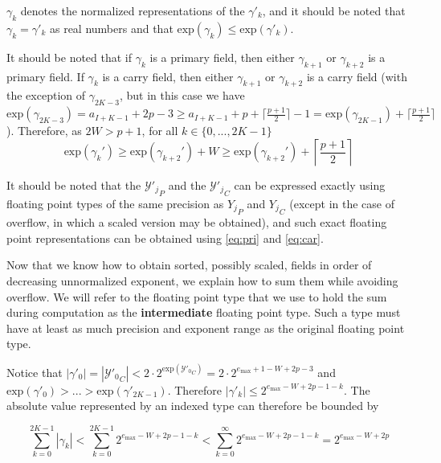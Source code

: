 \documentclass[12pt]{article}
\providecommand{\exp}{\ensuremath{\text{exp}}}
\providecommand{\max}{\ensuremath{\text{max}}}
\theoremstyle{definition}
\numberwithin{equation}{section}
\numberwithin{figure}{section}
\begin{document}
    $\gamma_k$ denotes the normalized representations of the $\gamma'_k$, and it should be noted that $\gamma_k = \gamma'_k$ as real numbers and that $\exp(\gamma_k) \leq \exp(\gamma'_k)$.

    It should be noted that if $\gamma_k$ is a primary field, then either $\gamma_{k + 1}$ or $\gamma_{k + 2}$ is a primary field. If $\gamma_k$ is a carry field, then either $\gamma_{k + 1}$ or $\gamma_{k + 2}$ is a carry field (with the exception of $\gamma_{2  K - 3}$, but in this case we have $\exp(\gamma_{2  K - 3}) = a_{I + K - 1} + 2  p - 3 \geq a_{I + K - 1} + p + \lceil\frac{p + 1}{2}\rceil - 1 = \exp(\gamma_{2  K - 1}) + \lceil\frac{p + 1}{2}\rceil$). Therefore, as $2  W > p + 1$, for all $k \in \{0, ..., 2  K - 1\}$
    \begin{equation}
      \exp(\gamma_k') \geq \exp(\gamma_{k + 2}') + W \geq \exp(\gamma_{k + 2}') + \left\lceil\frac{p + 1}{2}\right\rceil
      \label{eq:gammadecreasesfast}
    \end{equation}

    It should be noted that the ${\mathcal{Y}'_j}_P$ and the ${\mathcal{Y}'_j}_C$ can be expressed exactly using floating point types of the same precision as ${Y_j}_P$ and ${Y_j}_C$ (except in the case of overflow, in which a scaled version may be obtained), and such exact floating point representations can be obtained using  \eqref{eq:pri} and  \eqref{eq:car}.

    Now that we know how to obtain sorted, possibly scaled, fields in order of decreasing unnormalized exponent, we explain how to sum them while avoiding overflow. We will refer to the floating point type that we use to hold the sum during computation as the \textbf{intermediate} floating point type. Such a type must have at least as much precision and exponent range as the original floating point type.

    Notice that $|\gamma'_0| = |{\mathcal{Y}'_0}_C| < 2 \cdot 2^{\exp({\mathcal{Y}'_0}_C)} = 2 \cdot 2^{e_{\max} + 1 - W + 2  p - 3}$ and $\exp(\gamma'_0) > ... > \exp(\gamma'_{2  K - 1})$.  Therefore $|\gamma'_k| \leq 2^{e_{\max} - W + 2  p - 1 - k}$. The absolute value represented by an indexed type can therefore be bounded by

    \begin{equation}
      \label{eq:maxindexedvalue}
      \sum\limits_{k = 0}^{2  K - 1} |\gamma_k| < \sum\limits_{k = 0}^{2  K - 1} 2^{e_{\max} - W + 2  p - 1 - k} < \sum\limits_{k = 0}^{\infty} 2^{e_{\max} - W + 2  p - 1 - k} = 2^{e_{\max} - W + 2  p}
    \end{equation}
\end{document}
